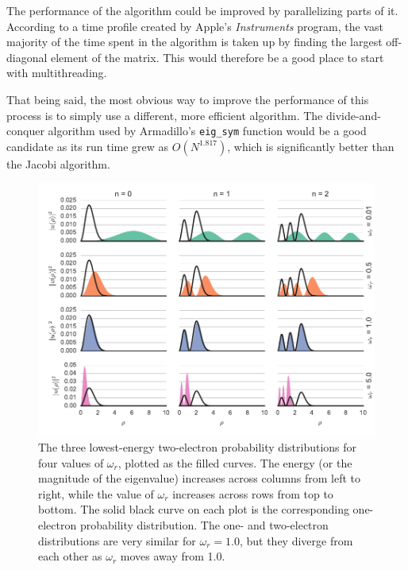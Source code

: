 \documentclass[aps,prc,reprint]{revtex4-1}
\begin{document}
    The performance of the algorithm could be improved by parallelizing parts of it. According to a time profile created by Apple's \emph{Instruments} program, the vast majority of the time spent in the algorithm is taken up by finding the largest off-diagonal element of the matrix. This would therefore be a good place to start with multithreading.

    That being said, the most obvious way to improve the performance of this process is to simply use a different, more efficient algorithm. The divide-and-conquer algorithm used by Armadillo's \texttt{eig\_sym} function would be a good candidate as its run time grew as $O(N^{1.817})$, which is significantly better than the Jacobi algorithm.



\begin{figure}
    \includegraphics{wavefunctions.pdf}
    \caption{The three lowest-energy two-electron probability distributions for four values of $\omega_r$, plotted as the filled curves. The energy (or the magnitude of the eigenvalue) increases across columns from left to right, while the value of $\omega_r$ increases across rows from top to bottom. The solid black curve on each plot is the corresponding one-electron probability distribution. The one- and two-electron distributions are very similar for $\omega_r = 1.0$, but they diverge from each other as $\omega_r$ moves away from 1.0.}
    \label{fig:wavefunctions}
\end{figure}
\end{document}
